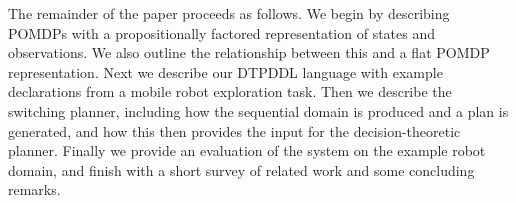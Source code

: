 \documentclass{article}
\begin{document}
The remainder of the paper proceeds as follows. We begin by describing
POMDPs with a propositionally factored representation of states and
observations. We also outline the relationship between this and a flat
POMDP representation. Next we describe our DTPDDL language with
example declarations from a mobile robot exploration task. Then we
describe the switching planner, including how the sequential domain is
produced and a plan is generated, and how this then provides the input
for the decision-theoretic planner. Finally we provide an evaluation
of the system on the example robot domain, and finish with a short
survey of related work and some concluding remarks.

























\end{document}
